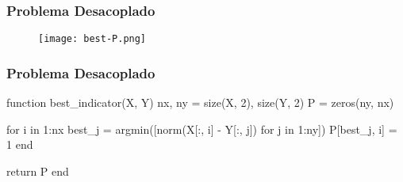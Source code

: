 \begin{frame}[fragile]
  \frametitle{Problema Desacoplado}
  \begin{figure}
    \centering
    \texttt{[image: best-P.png]}
  \end{figure}
\end{frame}

\begin{frame}[fragile]
  \frametitle{Problema Desacoplado}
  \begin{code}
    function best_indicator(X, Y)
      nx, ny = size(X, 2), size(Y, 2)
      P = zeros(ny, nx)

      for i in 1:nx
        best_j = argmin([norm(X[:, i] - Y[:, j]) for j in 1:ny])
        P[best_j, i] = 1
      end

      return P
    end
  \end{code}
\end{frame}
